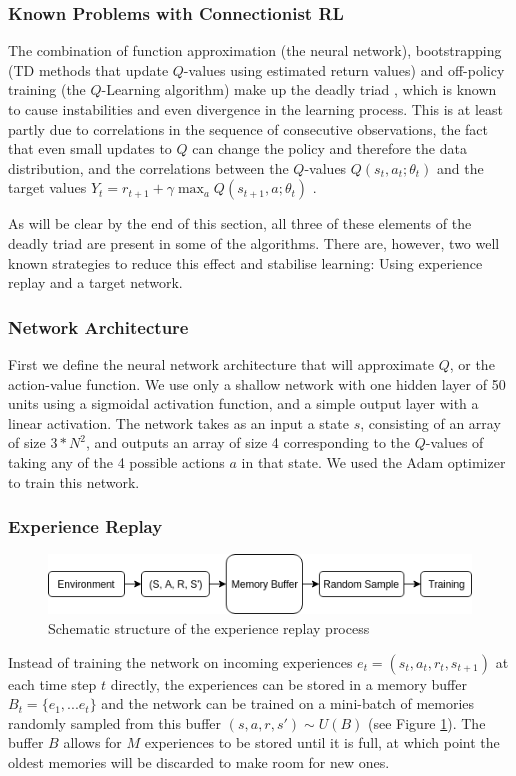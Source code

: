 \subsubsection{Known Problems with Connectionist RL}\label{sec:problems}
The combination of function approximation (the neural network), bootstrapping (TD methods that update $Q$-values using estimated return values) and off-policy training (the $Q$-Learning algorithm) make up the deadly triad \citep{sutton_barto_2018}, which is known to cause instabilities and even divergence in the learning process. This is at least partly due to correlations in the sequence of consecutive observations, the fact that even small updates to $Q$ can change the policy and therefore the data distribution, and the correlations between the $Q$-values $Q(s_t, a_t; \theta_t)$ and the target values $Y_t = r_{t+1} + \gamma \max_a Q(s_{t+1}, a; \theta_t)$ \citep{mnih2015human}.

As will be clear by the end of this section, all three of these elements of the deadly triad are present in some of the algorithms. There are, however, two well known strategies to reduce this effect and stabilise learning: Using experience replay and a target network.

\subsubsection{Network Architecture}\label{sec:architecture}
First we define the neural network architecture that will approximate $Q$, or the action-value function. We use only a shallow network with one hidden layer of 50 units using a sigmoidal activation function, and a simple output layer with a linear activation. The network takes as an input a state $s$, consisting of an array of size $3*N^2$, and outputs an array of size 4 corresponding to the $Q$-values of taking any of the 4 possible actions $a$ in that state. We used the Adam optimizer to train this network.

\subsubsection{Experience Replay}\label{sec:exp_replay}
\begin{figure}[h]
    \centering
    \includegraphics[width=1\linewidth]{img/Experience_Replay.png}
    \caption{Schematic structure of the experience replay process}
    \label{fig:expreplay}
\end{figure}
Instead of training the network on incoming experiences $e_t=(s_t,a_t,r_t,s_{t+1})$ at each time step $t$ directly, the experiences can be stored in a memory buffer $B_t=\{e_1,...e_t\}$ and the network can be trained on a mini-batch of memories randomly sampled from this buffer $(s,a,r,s') \sim U(B)$ (see Figure \ref{fig:expreplay}). The buffer $B$ allows for $M$ experiences to be stored until it is full, at which point the oldest memories will be discarded to make room for new ones.

